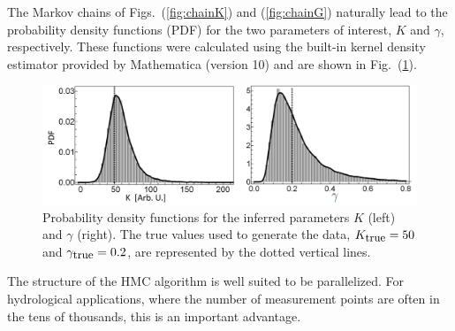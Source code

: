 \documentclass[12pt,a4paper,final]{iopart}
\begin{document}
%
The Markov chains of Figs.~(\ref{fig:chainK}) and (\ref{fig:chainG}) naturally lead to the probability density functions (PDF) for the two parameters of interest, $K$ and $\gamma$, respectively. These functions were calculated using the built-in kernel density estimator provided by Mathematica (version 10) and are shown in Fig.~(\ref{fig:KG_distr}).
\begin{figure}[htb!]
    \centering
    \includegraphics[width=1.0\textwidth]{Figs/FigKg.png}
    \caption{Probability density functions for the inferred parameters $K$ (left) and $\gamma$ (right). The true values used to generate the data, $K_{\mbox{\small true}}=50$ and $\gamma_{\mbox{\small true}}=0.2$, are represented by the dotted vertical lines.}
    \label{fig:KG_distr}
\end{figure}

The structure of the HMC algorithm is well suited to be parallelized. 
For hydrological applications, where the number of measurement points are often in the tens of thousands, this is an important advantage.
\end{document}

